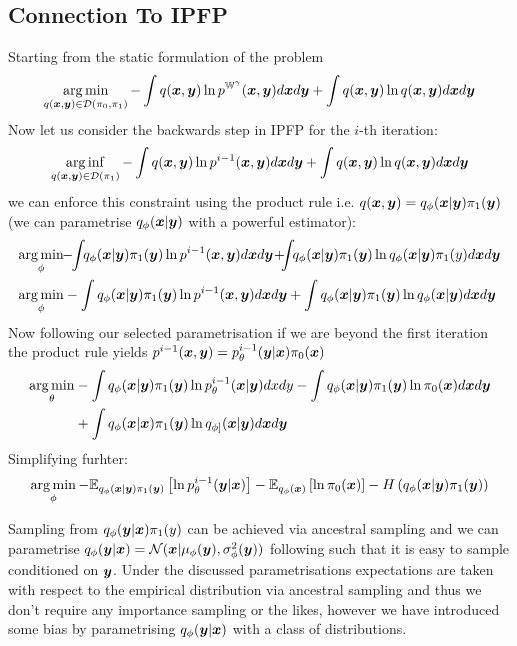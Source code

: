 \documentclass[a4paper,12pt,twoside,openright]{report}
\theoremstyle{definition}
\begin{document}
\subsection{Connection To IPFP}
Starting from the static formulation of the problem
\begin{align*}
\operatorname*{arg\,min}_{q({\bm{x}},{\bm{y}}) \in \mathcal{D}(\pi_0, \pi_1)}- \int q({\bm{x}},{\bm{y}}) \operatorname{ln} p^{\mathbb{W}^{\gamma}}({\bm{x}} ,{\bm{y}} )d{\bm{x}} d{\bm{y}} +\int q({\bm{x}},{\bm{y}}) \operatorname{ln} q({\bm{x}} ,{\bm{y}} )d{\bm{x}} d{\bm{y}}
\end{align*}
Now let us consider the backwards step in IPFP for the $i$-th iteration:
\begin{align*}
\operatorname*{arg\,inf}_{q({\bm{x}},{\bm{y}})  \in \mathcal{D}(\pi_1)}- \int q({\bm{x}},{\bm{y}})  \operatorname{ln} p^{i-1}({\bm{x}},{\bm{y}})d{\bm{x}} d{\bm{y}} +\int  q({\bm{x}},{\bm{y}}) \operatorname{ln}  q({\bm{x}},{\bm{y}}) d{\bm{x}} d{\bm{y}}
\end{align*}
we can enforce this constraint using the product rule i.e. $q({\bm{x}},{\bm{y}}) = q_{\phi}({\bm{x}}|{\bm{y}}) \pi_1({\bm{y}})$ (we can parametrise $q_{\phi}({\bm{x}}|{\bm{y}})$ with a powerful estimator):
\begin{align*}
\argmin_{\phi}&\!\!-\!\!\int\!\!q_{\phi}(\vx|\vy) \pi_1(\vy) \log p^{i-1}(\vx,\vy)d\vx d\vy\!+\!\!\!\int\!\!q_{\phi}(\vx|\vy) \pi_1(\vy) \log q_{\phi}(\vx|\vy)
\pi_1(y)d\vx d\vy\\
\argmin_{\phi}&- \int q_{\phi}(\vx|\vy) \pi_1(\vy) \log p^{i-1}(\vx,\vy)d\vx d\vy +\int q_{\phi}(\vx|\vy)\pi_1(\vy) \log q_{\phi}(\vx|\vy)
d\vx d\vy
\end{align*}
Now following our selected parametrisation if we are beyond the first iteration the product rule yields $p^{i-1}({\bm{x}} , {\bm{y}})= p^{i-1}_{\theta}({\bm{y}}|{\bm{x}})\pi_0({\bm{x}})$
\begin{align*}
\operatorname*{arg\,min}_\theta&- \int q_{\phi}({\bm{x}}|{\bm{y}}) \pi_1({\bm{y}}) \operatorname{ln}  p^{i-1}_{\theta}({\bm{x}}|{\bm{y}})dxdy - \int q_{\phi}({\bm{x}}|{\bm{y}}) \pi_1({\bm{y}}) \operatorname{ln}  \pi_0({\bm{x}}) d{\bm{x}} d{\bm{y}} \\
&+\int q_{\phi}({\bm{x}}|{\bm{x}}) \pi_1({\bm{y}}) \operatorname{ln} q_{\phi]}({\bm{x}}|{\bm{y}})d{\bm{x}} d{\bm{y}} 
\end{align*}
Simplifying furhter:
\begin{align*}
\operatorname*{arg\,min}_\phi- \mathbb{E}_{q_{\phi}({\bm{x}}|{\bm{y}})\pi_1({\bm{y}})}\left[  \operatorname{ln}  p^{i-1}_{\theta}({\bm{y}}|{\bm{x}})\right] -  \mathbb{E}_{q_{\phi}({\bm{x}})}\left[ \operatorname{ln}  \pi_0({\bm{x}}) \right] - H\left(q_{\phi}({\bm{x}}|{\bm{y}})\pi_1({\bm{y}})\right)
\end{align*}

Sampling from $q_{\phi}({\bm{y}}|{\bm{x}})\pi_1(y)$ can be achieved via  ancestral sampling and we can parametrise $q_{\phi}({\bm{y}}|{\bm{x}})=\mathcal{N}({\bm{x}} | \mu_{\phi}({\bm{y}}), \sigma^2_\phi({\bm{y}}))$ following \cite{kingma2013auto} such that it is easy to sample conditioned on ${\bm{y}}$. Under the discussed parametrisations expectations are taken with respect to the empirical distribution via ancestral sampling and thus we don't require any importance sampling or the likes, however we have introduced some bias by parametrising $q_{\phi}({\bm{y}}|{\bm{x}})$ with a class of distributions.
\end{document}
